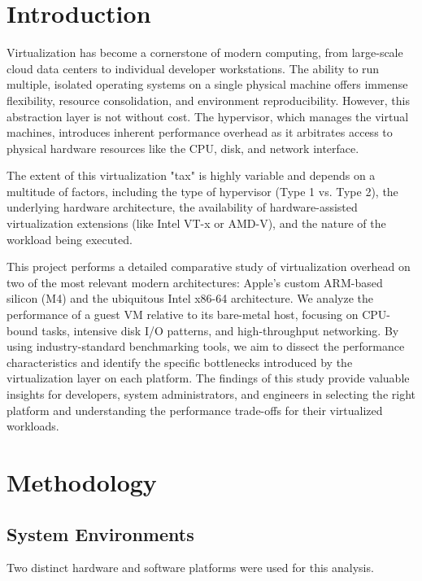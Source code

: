 \documentclass[conference]{IEEEtran}
\begin{document}
\section{Introduction}
Virtualization has become a cornerstone of modern computing, from large-scale cloud data centers to individual developer workstations. The ability to run multiple, isolated operating systems on a single physical machine offers immense flexibility, resource consolidation, and environment reproducibility. However, this abstraction layer is not without cost. The hypervisor, which manages the virtual machines, introduces inherent performance overhead as it arbitrates access to physical hardware resources like the CPU, disk, and network interface.

The extent of this virtualization "tax" is highly variable and depends on a multitude of factors, including the type of hypervisor (Type 1 vs. Type 2), the underlying hardware architecture, the availability of hardware-assisted virtualization extensions (like Intel VT-x or AMD-V), and the nature of the workload being executed.

This project performs a detailed comparative study of virtualization overhead on two of the most relevant modern architectures: Apple's custom ARM-based silicon (M4) and the ubiquitous Intel x86-64 architecture. We analyze the performance of a guest VM relative to its bare-metal host, focusing on CPU-bound tasks, intensive disk I/O patterns, and high-throughput networking. By using industry-standard benchmarking tools, we aim to dissect the performance characteristics and identify the specific bottlenecks introduced by the virtualization layer on each platform. The findings of this study provide valuable insights for developers, system administrators, and engineers in selecting the right platform and understanding the performance trade-offs for their virtualized workloads.

\section{Methodology}

\subsection{System Environments}
Two distinct hardware and software platforms were used for this analysis.
\end{document}
